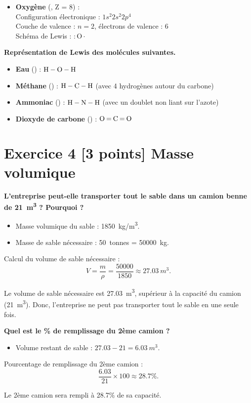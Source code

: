 \documentclass{exam}
\begin{document}
\begin{questions}
\begin{itemize}
    \item \textbf{Oxygène} (, Z = 8) :\\
    Configuration électronique : \( 1s^2 2s^2 2p^4 \)\\
    Couche de valence : \( n = 2 \), électrons de valence : 6\\
    Schéma de Lewis : \( : \text{O} \cdot \)
\end{itemize}

\question[3] \textbf{Représentation de Lewis des molécules suivantes.}

\begin{itemize}
    \item \textbf{Eau} () : \( \ce{H - O - H} \)
    \item \textbf{Méthane} () : \( \ce{H - C - H} \) (avec 4 hydrogènes autour du carbone)
    \item \textbf{Ammoniac} () : \( \ce{H - N - H} \) (avec un doublet non liant sur l'azote)
    \item \textbf{Dioxyde de carbone} () : \( \ce{O = C = O} \)
\end{itemize}

\end{questions}

\section*{Exercice 4 [3 points] Masse volumique}

\begin{questions}

\question[2] \textbf{L'entreprise peut-elle transporter tout le sable dans un camion benne de \SI{21}{m^3} ? Pourquoi ?}

\begin{itemize}
    \item Masse volumique du sable : \SI{1850}{kg/m^3}.
    \item Masse de sable nécessaire : \SI{50}{tonnes} = \SI{50000}{kg}.
\end{itemize}

Calcul du volume de sable nécessaire :
\[
V = \frac{m}{\rho} = \frac{50000}{1850} \approx \SI{27.03}{m^3}.
\]

Le volume de sable nécessaire est \SI{27.03}{m^3}, supérieur à la capacité du camion (\SI{21}{m^3}). Donc, l'entreprise ne peut pas transporter tout le sable en une seule fois.

\question[1] \textbf{Quel est le \% de remplissage du 2ème camion ?}

\begin{itemize}
    \item Volume restant de sable : \( 27.03 - 21 = \SI{6.03}{m^3} \).
\end{itemize}

Pourcentage de remplissage du 2ème camion :
\[
\frac{6.03}{21} \times 100 \approx 28.7\%.
\]

Le 2ème camion sera rempli à 28.7\% de sa capacité.

\end{questions}
\end{document}
